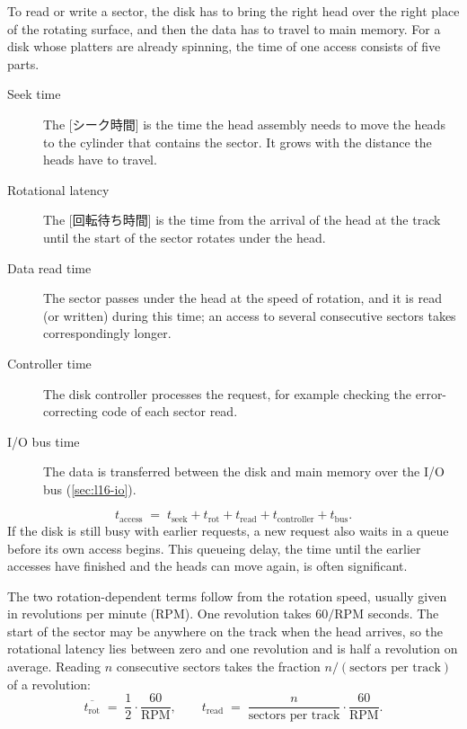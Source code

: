 \documentclass[../main.tex]{subfiles}
\begin{document}
To read or write a sector, the disk has to bring the right head over the
right place of the rotating surface, and then the data has to travel to
main memory.  For a disk whose
platters are already spinning, the time of one access consists of five
parts.
\begin{description}
  \item[Seek time] The [シーク時間] is the time the head
    assembly needs to move the heads to the cylinder that contains the
    sector.  It grows with the distance the heads have to travel.
  \item[Rotational latency] The [回転待ち時間] is
    the time from the arrival of the head at the track until the start of
    the sector rotates under the head.
  \item[Data read time] The sector passes under the head at the speed of
    rotation, and it is read (or written) during this time; an access to
    several consecutive sectors takes correspondingly longer.
  \item[Controller time] The disk controller processes the request, for
    example checking the error-correcting code of each sector read.
  \item[I/O bus time] The data is transferred between the disk and main
    memory over the I/O bus (\cref{sec:l16-io}).
\end{description}
\begin{equation}
  t_{\text{access}} \;=\; t_{\text{seek}} + t_{\text{rot}} + t_{\text{read}}
    + t_{\text{controller}} + t_{\text{bus}} .
  \label{eq:l16-access}
\end{equation}
If the disk is still busy with earlier requests, a new request also waits in
a queue before its own access begins.  This queueing delay, the time until
the earlier accesses have finished and the heads can move again, is often
significant.

The two rotation-dependent terms follow from the rotation speed, usually
given in revolutions per minute (RPM).  One revolution takes $60/\text{RPM}$
seconds.  The start of the sector may be
anywhere on the track when the head arrives, so the rotational latency lies
between zero and one revolution and is half a revolution on average.  Reading
$n$ consecutive sectors takes the fraction $n/(\text{sectors per track})$ of a
revolution:
\begin{equation}
  \overline{t_{\text{rot}}} \;=\; \frac{1}{2}\cdot\frac{60}{\text{RPM}} ,
  \qquad
  t_{\text{read}} \;=\; \frac{n}{\text{sectors per track}}\cdot
    \frac{60}{\text{RPM}} .
  \label{eq:l16-rot}
\end{equation}
\end{document}
